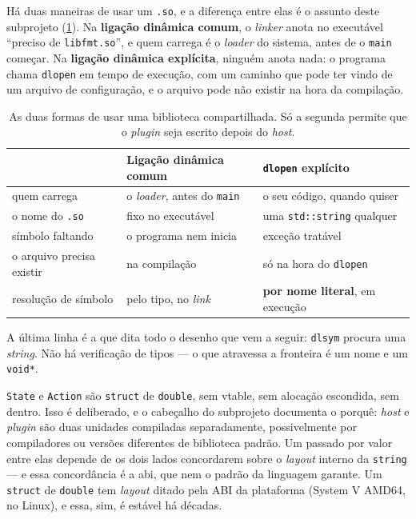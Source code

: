 Há duas maneiras de usar um \texttt{.so}, e a diferença entre elas é o assunto
deste subprojeto (\cref{tab:ligacao}). Na \textbf{ligação dinâmica comum}, o
\emph{linker} anota no executável ``preciso de \texttt{libfmt.so}'', e quem
carrega é o \emph{loader} do sistema, antes de o \texttt{main} começar. Na
\textbf{ligação dinâmica explícita}, ninguém anota nada: o programa chama
\texttt{dlopen} em tempo de execução, com um caminho que pode ter vindo de um
arquivo de configuração, e o arquivo pode não existir na hora da compilação.

\begin{table}[htbp]
\centering
\caption{As duas formas de usar uma biblioteca compartilhada. Só a segunda
         permite que o \emph{plugin} seja escrito depois do \emph{host}.}
\label{tab:ligacao}
\footnotesize
\begin{tabular}{@{}lll@{}}
\toprule
 & \textbf{Ligação dinâmica comum} & \textbf{\texttt{dlopen} explícito} \\
\midrule
quem carrega            & o \emph{loader}, antes do \texttt{main} & o seu código, quando quiser \\
o nome do \texttt{.so}  & fixo no executável            & uma \texttt{std::string} qualquer \\
símbolo faltando        & o programa nem inicia          & exceção tratável \\
o arquivo precisa existir & na compilação                & só na hora do \texttt{dlopen} \\
resolução de símbolo    & pelo tipo, no \emph{link}      & \textbf{por nome literal}, em execução \\
\bottomrule
\end{tabular}
\end{table}

A última linha é a que dita todo o desenho que vem a seguir: \texttt{dlsym}
procura uma \emph{string}. Não há verificação de tipos --- o que atravessa a
fronteira é um nome e um \texttt{void*}.

\begin{porque}
\texttt{State} e \texttt{Action} são \texttt{struct} de \texttt{double}, sem
\gls{vtable}, sem alocação escondida, sem  dentro. Isso é
deliberado, e o cabeçalho do subprojeto documenta o porquê: \emph{host} e
\emph{plugin} são duas unidades compiladas separadamente, possivelmente por
compiladores ou versões diferentes de biblioteca padrão. Um
 passado por valor entre elas depende de os dois lados
concordarem sobre o \emph{layout} interno da \texttt{string} --- e essa
concordância é a \gls{abi}, que nem o padrão da linguagem garante. Um
\texttt{struct} de \texttt{double} tem \emph{layout} ditado pela ABI da
plataforma (System V AMD64, no Linux), e essa, sim, é estável há décadas.
\end{porque}

